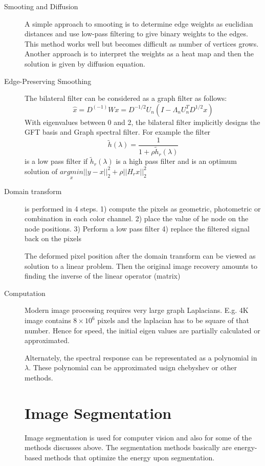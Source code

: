 \documentclass[10pt,a4paper, nocenter]{report}
\begin{document}
	\begin{description}
		\item[Smooting and Diffusion] A simple approach to smooting is to determine edge weights as euclidian distances and use low-pass filtering to give binary weights to the edges. This method works well but becomes difficult as number of vertices grows. Another approach is to interpret the weights as a heat map and then the solution is given by diffusion equation. 
		
		\item[Edge-Preserving Smoothing] The bilateral filter can be considered as a graph filter as follows:
		$$ \hat{x} = D^(-1)Wx = D^{-1/2}U_{n}(I-\Lambda_{n}U_{n}^{T}D^{1/2}x) $$
		With eigenvalues between 0 and 2, the bilateral filter implicitly designs the GFT basis and Graph spectral filter. For example the filter $$ \tilde{h}(\lambda) = \frac{1}{1+\rho \tilde{h}_{r}(\lambda)} $$ is a low pass filter if $\tilde{h}_{r}(\lambda)$ is a high pass filter and is an optimum solution of $\underset{x}{arg min}\lvert \lvert y-x\rvert\rvert _{2}^2+\rho \lvert \lvert H_{r}x\rvert \rvert _{2}^2$
		
		\item[Domain transform] is performed in 4 steps. 1) compute the pixels as geometric, photometric or combination in each color channel. 2) place the value of he node on the node positions. 3) Perform a low pass filter 
		4) replace the filtered signal back on the pixels
		
		The deformed pixel position after the domain transform can be viewed as solution to a linear problem. Then the original image recovery amounts to finding the inverse of the linear operator (matrix)
		
		\item [Computation] Modern image processing requires very large graph Laplacians. E.g. 4K image contains $8\times 10^6$ pixels and the laplacian has to be square of that number. Hence for speed, the initial eigen values are partially calculated or approximated. 
		
		Alternately, the spectral response can be representated as a polynomial in $\lambda$. These polynomial can be approximated usign chebyshev or other methods. 
		
		\chapter*{Image Segmentation}
		\thispagestyle{fancy}
		Image segmentation is used for computer vision and also for some of the methods discusses above. The segmentation methods basically are energy-based methods that optimize the energy upon segmentation.
		

\end{description}
\end{document}
